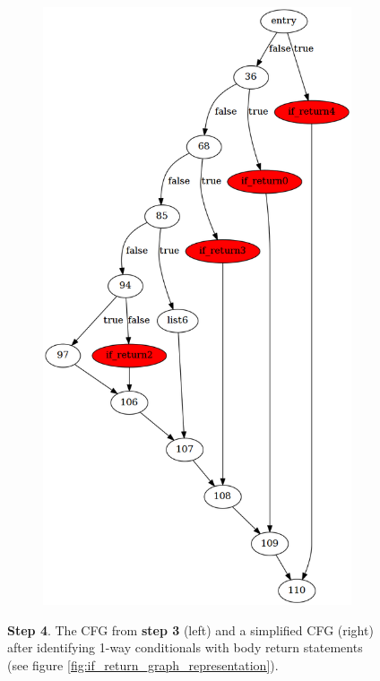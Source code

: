 \begin{figure}[htbp]
\begin{subfigure}[ht]{0.45\textwidth}
		\includegraphics[width=\textwidth]{inc/appendices/control_flow_analysis_example/step4_after.png}
	\end{subfigure}
	\caption{\textbf{Step 4}. The CFG from \textbf{step 3} (left) and a simplified CFG (right) after identifying 1-way conditionals with body return statements (see figure \ref{fig:if_return_graph_representation}).}
	\label{fig:step_4}
\end{figure}

